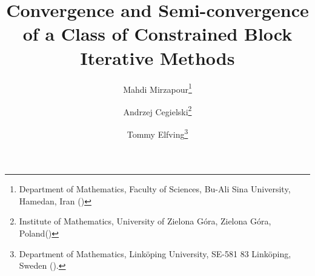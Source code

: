 

\usepackage{amsmath}
\usepackage{amssymb}
\usepackage{amsfonts}
\usepackage{lipsum}
\usepackage{graphicx}
\usepackage{subfigure}
\usepackage{epstopdf}
\usepackage{algorithm}
\usepackage[utf8]{inputenc}
\usepackage[T1]{fontenc}
\usepackage{url}
\usepackage{algpseudocode}
\usepackage{multirow}







\ifpdf
\else
\fi

\newcommand{\creflastconjunction}{, and~}



\title{Convergence and Semi-convergence of a Class of Constrained Block Iterative Methods}

\author{Mahdi Mirzapour\thanks{Department of Mathematics, Faculty of Sciences, Bu-Ali Sina University, Hamedan, Iran
  ()}\and Andrzej Cegielski\thanks
{Institute of Mathematics, University of Zielona G\'{o}ra, Zielona G\'{o}ra, Poland()} \and Tommy Elfving\thanks{Department of Mathematics, Link\"{o}ping University, SE-581 83 Link\"{o}ping, Sweden
  ().}}

\usepackage{amsopn}
\DeclareMathOperator{\diag}{diag}


